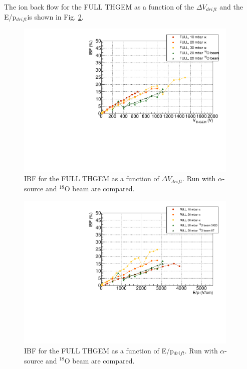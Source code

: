 \documentclass[a4paper, 11 pt]{report}
\newcommand{\Vdrift}{$ \Delta V_{drift}$}
\newcommand{\Edrift}{E/p$_{drift}$}
\begin{document}
  The ion back flow for the FULL THGEM as a function of the \Vdrift{} and the \Edrift is shown in 
  Fig. \ref{fig:IBF_FULL_beam_F}. 
  \begin{figure}[htbp]
	\centering
	\includegraphics[width=0.95\textwidth]{Immagini/IBF_FULL_Comparison.pdf}
	\caption{IBF for the FULL THGEM as a function of \Vdrift. Run with 
	$\alpha$-source	and $^{18}$O beam are compared.}
	\label{fig:IBF_FULL_beam}
  \end{figure}
  \begin{figure}[htbp]
	\centering
	\includegraphics[width=0.95\textwidth]{Immagini/IBF_FULL_Comparison_F.pdf}
	\caption{IBF for the FULL THGEM as a function of \Edrift. Run with 
	$\alpha$-source	and $^{18}$O beam are compared.}
	\label{fig:IBF_FULL_beam_F}
  \end{figure}
 
  \clearpage
\end{document}
